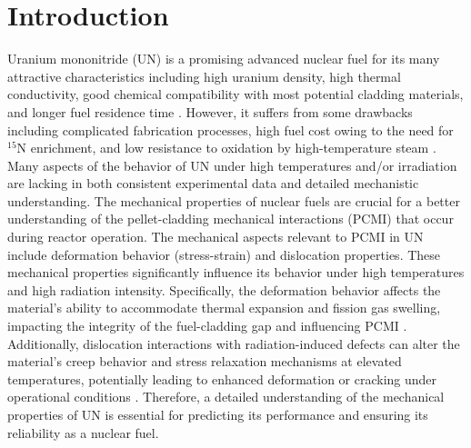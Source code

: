 \documentclass[applsci,article,submit,pdftex,moreauthors]{Definitions/mdpi}
\newcommand{\?}{\stackrel{?}{=}}
\begin{document}
\section{Introduction}

Uranium mononitride (UN) is a promising advanced nuclear fuel for its many attractive characteristics including high uranium density, high thermal conductivity, good chemical compatibility with most potential cladding materials, and longer fuel residence time \cite{Ekberg2018, Wallenius2020, Uno2020}. However, it suffers from some drawbacks including complicated fabrication processes, high fuel cost owing to the need for $^{15}$N enrichment, and low resistance to oxidation by high-temperature steam \cite{Ekberg2018, Wallenius2020, Uno2020}. Many aspects of the behavior of UN under high temperatures and/or irradiation are lacking in both consistent experimental data and detailed mechanistic understanding. The mechanical properties of nuclear fuels are crucial for a better understanding of the pellet-cladding mechanical interactions (PCMI) that occur during reactor operation. The mechanical aspects relevant to PCMI in UN include deformation behavior (stress-strain) and dislocation properties. These mechanical properties significantly influence its behavior under high temperatures and high radiation intensity. Specifically, the deformation behavior affects the material's ability to accommodate thermal expansion and fission gas swelling, impacting the integrity of the fuel-cladding gap and influencing PCMI \cite{Olander2017, Olander2021}. Additionally, dislocation interactions with radiation-induced defects can alter the material's creep behavior and stress relaxation mechanisms at elevated temperatures, potentially leading to enhanced deformation or cracking under operational conditions \cite{Olander2017, Olander2021}. Therefore, a detailed understanding of the mechanical properties of UN is essential for predicting its performance and ensuring its reliability as a nuclear fuel.

\end{document}

